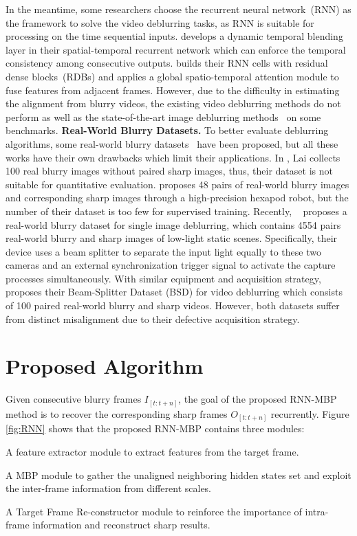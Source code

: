\documentclass[letterpaper]{article} \usepackage{aaai22}  \usepackage{times}  \usepackage{helvet}  \usepackage{courier}  \usepackage[hyphens]{url}  \usepackage{graphicx} \urlstyle{rm} \def\UrlFont{\rm}  \usepackage{natbib}  \usepackage{caption} \DeclareCaptionStyle{ruled}{labelfont=normalfont,labelsep=colon,strut=off} \frenchspacing  \setlength{\pdfpagewidth}{8.5in}  \setlength{\pdfpageheight}{11in}  \newcommand{\hang}{\textcolor[rgb]{0.98,0.5,0.04}}
\begin{document}
In the meantime, 
some researchers choose the recurrent neural network~(RNN) as the framework to solve the video deblurring tasks,
as RNN is suitable for processing on the time sequential inputs.
\cite{Kim_2017_ICCV} develops a dynamic temporal blending layer in their spatial-temporal recurrent network which can enforce the temporal consistency among consecutive outputs.
\cite{ESTRNN} builds their RNN cells with residual dense blocks~(RDBs) and applies a global spatio-temporal attention module to fuse features from adjacent frames.
However, due to the difficulty in estimating the alignment from blurry videos, the existing video deblurring methods do not perform as well as the state-of-the-art image deblurring methods~\cite{Zamir2021MPRNet, Chen_2021_CVPR} on some benchmarks.
\newline
{\bf Real-World Blurry Datasets.} 
To better evaluate deblurring algorithms, some real-world blurry datasets~\cite{lai_blur, kohler, RealBlur, ESTRNN} have been proposed,
but all these works have their own drawbacks which limit their applications. 
In \cite{lai_blur}, Lai collects 100 real blurry images without paired sharp images, thus, their dataset is not suitable for quantitative evaluation.\cite{kohler} proposes 48 pairs of real-world blurry images and corresponding sharp images through a high-precision hexapod robot, but the number of their dataset is too few for supervised training. 
Recently, ~\cite{RealBlur} proposes a real-world blurry dataset for single image deblurring, which contains 4554 pairs real-world blurry and sharp images of low-light static scenes.
Specifically, their device uses a beam splitter to separate the input light equally to these two cameras and an external synchronization trigger signal to activate the capture processes simultaneously.
With similar equipment and acquisition strategy, ~\cite{ESTRNN} proposes their Beam-Splitter Dataset (BSD) for video deblurring which consists of 100 paired real-world blurry and sharp videos. 
However, both datasets suffer from distinct misalignment due to their defective acquisition strategy.


\section{Proposed Algorithm}
Given consecutive blurry frames $I_{[t:t+n]}$, the goal of the proposed RNN-MBP method is to recover the corresponding sharp frames $O_{[t:t+n]}$ recurrently.
Figure \ref{fig:RNN} shows that the proposed RNN-MBP contains three modules:
\begin{compactitem}
    \item A feature extractor module to extract features from the target frame.
    \item A MBP module to gather the unaligned neighboring hidden states set and exploit the inter-frame information from different scales.
    \item A Target Frame Re-constructor module to reinforce the importance of intra-frame information and reconstruct sharp results.
\end{compactitem}
\end{document}
